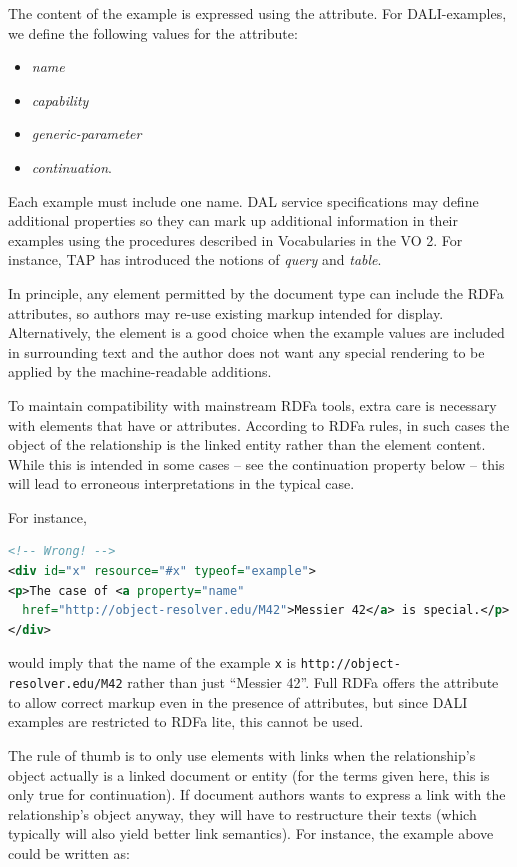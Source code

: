 \documentclass[11pt,letter]{ivoa}
\begin{document}
The content of the example is expressed using the  attribute. For
DALI-examples, we define the following values for the  attribute:

\begin{itemize}
\item \emph{name}
\item \emph{capability}
\item \emph{generic-parameter}
\item \emph{continuation}.
\end{itemize}

Each example must include one
name.  DAL service specifications may define additional
properties so they can mark up additional information in their examples
using the procedures described in Vocabularies in the VO 2.  For
instance, TAP has introduced the notions of \emph{query} and \emph{table}.

In principle, any element permitted by the document type can include the RDFa
attributes, so authors may re-use existing markup intended for display.
Alternatively, the  element is a good choice when the example values are
included in surrounding text and the author does not want any special rendering
to be applied by the machine-readable additions.

To maintain compatibility with mainstream RDFa tools, extra care is
necessary with elements that have  or 
attributes.  According to RDFa rules, in such cases the object of the
relationship is the linked entity rather than the element content.
While this is intended in some cases -- see the continuation property
below -- this will lead to erroneous interpretations in the typical
case.

For instance,

\begin{lstlisting}[language=XML]
<!-- Wrong! -->
<div id="x" resource="#x" typeof="example">
<p>The case of <a property="name"
  href="http://object-resolver.edu/M42">Messier 42</a> is special.</p>
</div>
\end{lstlisting}

would imply that the name of the example \texttt{x} is
\nolinkurl{http://object-resolver.edu/M42} rather than just ``Messier
42''.  Full RDFa offers the  attribute to allow correct
markup even in the presence of  attributes, but since DALI
examples are restricted to RDFa lite, this cannot be used.

The rule of thumb is to only use elements with links when the
relationship's object actually is a linked document or entity (for the
terms given here, this is only true for continuation).  If document
authors wants to express a link with the relationship's object anyway,
they will have to restructure their texts (which typically will also
yield better link semantics).  For instance, the example above could be
written as:
\end{document}
